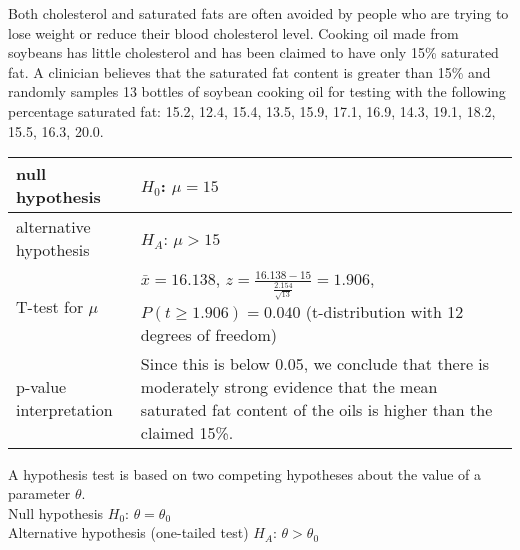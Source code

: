 \begin{example}
    Both cholesterol and saturated fats are often avoided by people who are trying to lose weight or reduce their blood cholesterol level. Cooking oil made from soybeans has little cholesterol and has been claimed to have only 15\% saturated fat. A clinician believes that the saturated fat content is greater than 15\% and randomly samples 13 bottles of soybean cooking oil for testing with the following percentage saturated fat: 15.2, 12.4, 15.4, 13.5, 15.9, 17.1, 16.9, 14.3, 19.1, 18.2, 15.5, 16.3, 20.0.
    \begin{center}
       \begin{tabular}{p{4cm}|p{7cm}}
            null hypothesis & $H_0$: $\mu=15$ \\
            \hline
            alternative hypothesis & $H_A$: $\mu > 15$ \\
            \hline
            T-test for $\mu$ & $\bar{x} = 16.138$, $z=\frac{16.138-15}{\frac{2.154}{\sqrt{13}}} = 1.906$, $P(t\ge 1.906) = 0.040$ (t-distribution with 12 degrees of freedom) \\
            \hline
            p-value interpretation & Since this is below 0.05, we conclude that there is moderately strong evidence that the mean saturated fat content of the oils is higher than the claimed 15\%.
       \end{tabular}
    \end{center}
	\begin{center}
	\end{center}
\end{example}

A hypothesis test is based on two competing hypotheses about the value of a parameter $\theta$. \\
Null hypothesis $H_0$: $\theta = \theta_0$ \\
Alternative hypothesis (one-tailed test) $H_A$: $\theta > \theta_0$

